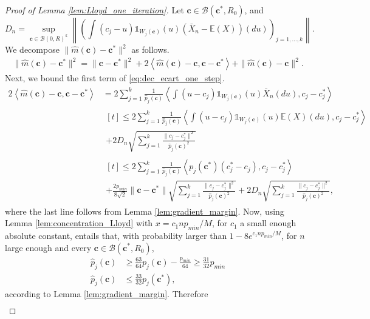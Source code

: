 \documentclass[noinfoline,preprint]{article}
\newcommand{\cb}{\mathbf{c}}
\newcommand{\E}{\mathbb{E}}
\renewcommand{\1}{\mathds 1}
\newcommand{\B}{\mathcal{B}}
\begin{document}
\begin{proof}[Proof of Lemma \ref{lem:Lloyd_one_iteration}]
Let $\cb \in \B(\cb^*,R_0)$, and 
\[
D_n = \sup_{\cb \in \B(0,R)^k} \left \| \left (    \int  (c_j-u)\1_{W_j(\cb)}(u)(\bar{X}_n - \mathbb{E}(X))(du)  \right )_{j=1, \hdots, k}  \right \|.
\]
We decompose $\|\hat{m}(\cb) - \cb^*\|^2$ as follows.
\begin{align}\label{eq:dec_ecart_one_step}
\|\hat{m}(\cb) - \cb^*\|^2 = \|\cb - \cb^*\|^2 + 2 \left\langle\hat{m}(\cb) - \cb,\cb-\cb^*\right\rangle + \|\hat{m}(\cb) - \cb\|^2.
\end{align}
Next, we bound the first term of \eqref{eq:dec_ecart_one_step}.
\begin{align*}
2 \left\langle\hat{m}(\cb) - \cb,\cb-\cb^*\right\rangle & = 2 \sum_{j=1}^{k} \frac{1}{\hat{p}_j(\cb)} \left\langle \int (u-c_j)\1_{W_j(\cb)}(u) \bar{X}_n(du), c_j - c_j^*\right\rangle \\
     & \begin{multlined}[t]\leq 2 \sum_{j=1}^{k} \frac{1}{\hat{p}_j(\cb)} \left\langle \int (u-c_j)\1_{W_j(\cb)}(u) \E(X)(du), c_j - c_j^*\right\rangle \\+ 2 D_n \sqrt{\sum_{j=1}^k \frac{\|c_j-c^*_j\|^2}{\hat{p}_j(\cb)^2}}
     \end{multlined} \\
     &\begin{multlined}[t]
     \leq 2 \sum_{j=1}^{k} \frac{1}{\hat{p}_j(\cb)} \left\langle p_j(\cb^*)(c_j^*-c_j), c_j - c_j^*\right\rangle \\
     + \frac{2 p_{min}}{8\sqrt{2}}\|\cb - \cb^*\|\sqrt{\sum_{j=1}^k \frac{\|c_j-c^*_j\|^2}{\hat{p}_j(\cb)^2}} + 2D_n \sqrt{\sum_{j=1}^k \frac{\|c_j-c^*_j\|^2}{\hat{p}_j(\cb)^2}}, 
     \end{multlined}
\end{align*}
where the last line follows from Lemma \ref{lem:gradient_margin}. Now, using Lemma \ref{lem:concentration_Lloyd} with $x= c_1 n p_{min}/M$, for $c_1$ a small enough absolute constant, entails that, with probability larger than $1-8e^{ c_1 n p_{min}/M}$, for $n$ large enough and every $\cb \in \B(\cb^*,R_0)$, 
\begin{align*}
\hat{p}_j(\cb) & \geq \frac{63}{64}p_j(\cb) - \frac{p_{min}}{64} \geq \frac{31}{32} p_{min} \\
\hat{p}_j(\cb) & \leq \frac{33}{32}p_j(\cb^*),
\end{align*} 
according to Lemma \ref{lem:gradient_margin}. Therefore
\begin{multline}\label{eq:Lloyd_oneiter_firstterm}

\end{multline}
\end{proof}
\end{document}
